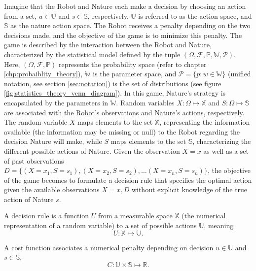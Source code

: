 	Imagine that the Robot and Nature each make a decision by choosing an action from a set, $u \in \mathbb{U}$ and $s \in \mathbb{S}$, respectively. $\mathbb{U}$ is referred to as the action space, and $\mathbb{S}$ as the nature action space. The Robot receives a penalty depending on the two decisions made, and the objective of the game is to minimize this penalty. The game is described by the interaction between the Robot and Nature, characterized by the statistical model defined by the tuple $(\Omega, \mathcal{F}, \mathbb{P},\mathbb{W},\mathcal{P})$. Here, $(\Omega, \mathcal{F}, \mathbb{P})$ represents the probability space (refer to chapter \ref{chp:probaiblity_theory}), $\mathbb{W}$ is the parameter space, and $\mathcal{P}=\{p: w \in \mathbb{W}\}$ (unified notation, see section \ref{sec:notation}) is the set of distributions (see figure \ref{fig:statistics_theory_venn_diagram}). In this game, Nature's strategy is encapsulated by the parameters in $\mathbb{W}$. Random variables $X: \Omega \mapsto \mathbb{X}$ and $S: \Omega \mapsto \mathbb{S}$ are associated with the Robot's observations and Nature's actions, respectively. The random variable $X$ maps elements to the set $\mathbb{X}$, representing the information available (the information may be missing or null) to the Robot regarding the decision Nature will make, while $S$ maps elements to the set $\mathbb{S}$, characterizing the different possible actions of Nature. Given the observation $X=x$ as well as a set of past observations $D= \{(X=x_1,S=s_1),(X=x_2,S=s_2),\dots (X=x_n,S=s_n)\}$, the objective of the game becomes to formulate a decision rule that specifies the optimal action given the available observations $X=x, D$ without explicit knowledge of the true action of Nature $s$.
	
	\begin{definition}
		\label{def:decision_rule}
		A decision rule is a function $U$ from a measurable space $\mathbb{X}$ (the numerical representation of a random variable) to a set of possible actions $\mathbb{U}$, meaning
		\begin{equation}
			U: \mathbb{X} \mapsto \mathbb{U}.
		\end{equation}
	\end{definition}
	
	\begin{definition}
		\label{def:cost_function}
		A cost function associates a numerical penalty depending on decision $u \in \mathbb{U}$ and $s \in \mathbb{S}$,
		\begin{equation}
			C: \mathbb{U} \times \mathbb{S} \mapsto \mathbb{R}.
		\end{equation}
	\end{definition}
	
